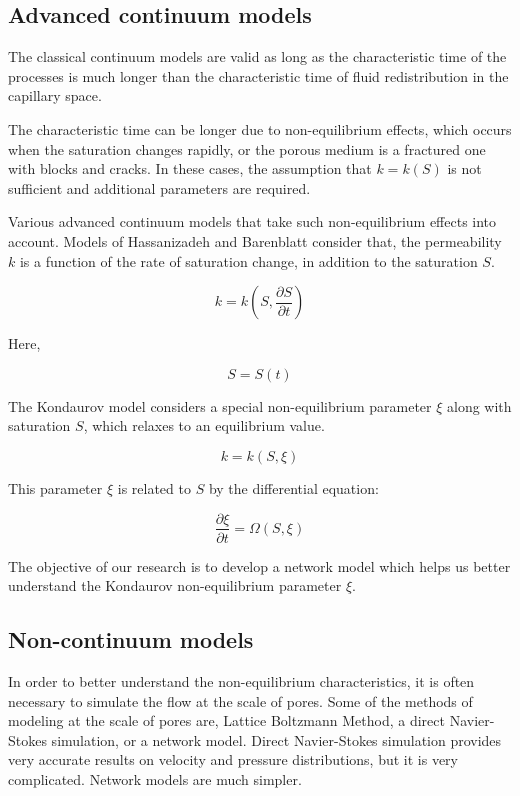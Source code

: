 \subsection{Advanced continuum models}
	The classical continuum models are valid as long as the characteristic time of the processes is much longer than the characteristic time of fluid redistribution in the capillary space.
	
	The characteristic time can be longer due to non-equilibrium effects, which occurs when the saturation changes rapidly, or the porous medium is a fractured one with blocks and cracks. In these cases, the assumption that $k = k(S)$ is not sufficient and additional parameters are required.

	Various advanced continuum models that take such non-equilibrium effects into account. Models of Hassanizadeh \cite{hassanizadeh2004continuum} \cite{hassanizadeh1987high} and Barenblatt \cite{barenblatt1960basic} consider that, the permeability $k$ is a function of the rate of saturation change, in addition to the saturation $S$.                  
	
	\begin{equation}
		k = k(S, \frac{\partial S}{\partial t})
	\end{equation}
	
	Here,
	
	\begin{equation}
		S = S(t)
	\end{equation}
	
	The Kondaurov model \cite{kondaurov2009non} considers a special non-equilibrium parameter $\xi$ along with saturation $S$, which relaxes to an equilibrium value. \cite{kondaurov2007thermodynamically}
	
	\begin{equation}
		k = k(S, \xi)
	\end{equation}
	
	This parameter $\xi$ is related to $S$ by the differential equation:
	
	\begin{equation}
		\frac{\partial \xi}{\partial t} = \Omega ( S, \xi )
	\end{equation}
	
	The objective of our research is to develop a network model which helps us better understand the Kondaurov non-equilibrium parameter $\xi$.
	 
\subsection{Non-continuum models}
	In order to better understand the non-equilibrium characteristics, it is often necessary to simulate the flow at the scale of pores. Some of the methods of modeling at the scale of pores are, Lattice Boltzmann Method, a direct Navier-Stokes simulation, or a network model. Direct Navier-Stokes simulation provides very accurate results on velocity and pressure distributions, but it is very complicated. Network models are much simpler.
	
